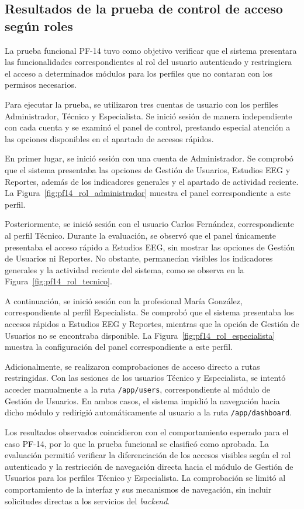 \subsection{Resultados de la prueba de control de acceso según roles}

La prueba funcional PF-14 tuvo como objetivo verificar que el sistema presentara las funcionalidades correspondientes al rol del usuario autenticado y restringiera el acceso a determinados módulos para los perfiles que no contaran con los permisos necesarios.

Para ejecutar la prueba, se utilizaron tres cuentas de usuario con los perfiles Administrador, Técnico y Especialista. Se inició sesión de manera independiente con cada cuenta y se examinó el panel de control, prestando especial atención a las opciones disponibles en el apartado de accesos rápidos.

En primer lugar, se inició sesión con una cuenta de Administrador. Se comprobó que el sistema presentaba las opciones de Gestión de Usuarios, Estudios EEG y Reportes, además de los indicadores generales y el apartado de actividad reciente. La Figura~\ref{fig:pf14_rol_administrador} muestra el panel correspondiente a este perfil.

Posteriormente, se inició sesión con el usuario Carlos Fernández, correspondiente al perfil Técnico. Durante la evaluación, se observó que el panel únicamente presentaba el acceso rápido a Estudios EEG, sin mostrar las opciones de Gestión de Usuarios ni Reportes. No obstante, permanecían visibles los indicadores generales y la actividad reciente del sistema, como se observa en la Figura~\ref{fig:pf14_rol_tecnico}.

A continuación, se inició sesión con la profesional María González, correspondiente al perfil Especialista. Se comprobó que el sistema presentaba los accesos rápidos a Estudios EEG y Reportes, mientras que la opción de Gestión de Usuarios no se encontraba disponible. La Figura~\ref{fig:pf14_rol_especialista} muestra la configuración del panel correspondiente a este perfil.

Adicionalmente, se realizaron comprobaciones de acceso directo a rutas restringidas. Con las sesiones de los usuarios Técnico y Especialista, se intentó acceder manualmente a la ruta \texttt{/app/users}, correspondiente al módulo de Gestión de Usuarios. En ambos casos, el sistema impidió la navegación hacia dicho módulo y redirigió automáticamente al usuario a la ruta \texttt{/app/dashboard}.

Los resultados observados coincidieron con el comportamiento esperado para el caso PF-14, por lo que la prueba funcional se clasificó como aprobada. La evaluación permitió verificar la diferenciación de los accesos visibles según el rol autenticado y la restricción de navegación directa hacia el módulo de Gestión de Usuarios para los perfiles Técnico y Especialista. La comprobación se limitó al comportamiento de la interfaz y sus mecanismos de navegación, sin incluir solicitudes directas a los servicios del \textit{backend}.


